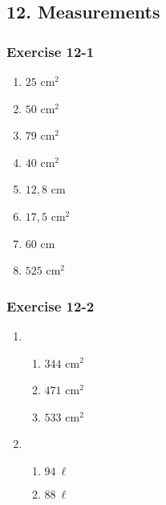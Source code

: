 {\begin{multicols}{3}
\begin{enumerate}[noitemsep, label=\textbf{\arabic*}.]
\end{enumerate}
\end{multicols}

\subsection*{12. Measurements}
\begin{multicols}{3}
\subsubsection*{Exercise 12-1} %
\begin{enumerate}[noitemsep, label=\textbf{\arabic*}. ] 
\item $25$ cm$^2$
\item $50$ cm$^2$
\item $79$ cm$^2$
\item $40$ cm$^2$
\item $12,8$ cm
\item $17,5$ cm$^2$
\item $60$ cm
\item $525$ cm$^2$
\end{enumerate}


\subsubsection*{Exercise 12-2} %
\begin{enumerate}[noitemsep, label=\textbf{\arabic*}. ] 
\item %
    \begin{enumerate}[noitemsep, label=\textbf{(\alph*)} ]
	  \item $344$ cm$^2$
	  \item  $471$ cm$^2$
	  \item  $533$ cm$^2$
    \end{enumerate}


\item %
    \begin{enumerate}[noitemsep, label=\textbf{(\alph*)} ]
	  \item $94~ \ell$ %
	  \item $88 ~\ell$%
    \end{enumerate}
\end{enumerate}       



\end{multicols}}
